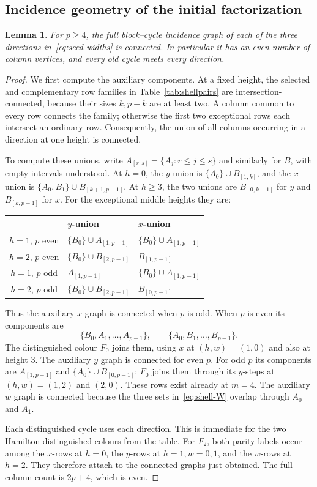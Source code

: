 \documentclass[11pt,reqno]{amsart}
\numberwithin{equation}{section}
\newtheorem{lemma}[theorem]{Lemma}
\theoremstyle{definition}
\theoremstyle{remark}
\begin{document}
\subsection{Incidence geometry of the initial factorization}
\begin{lemma}\label{lem:seed-incidence}
For $p\ge4$, the full block--cycle incidence graph of each of the three
directions in~\eqref{eq:seed-widths} is connected. In particular it has an even
number of column vertices, and every old cycle meets every direction.
\end{lemma}
\begin{proof}
We first compute the auxiliary components. At a fixed height, the selected and
complementary row families in Table~\ref{tab:shellpairs} are intersection-connected, because
their sizes $k,p-k$ are at least two. A column common to every row connects
the family; otherwise the first two exceptional rows each intersect an
ordinary row. Consequently,
the union of all columns occurring in a direction at one height is connected.

To compute these unions, write
$A_{[r,s]}=\{A_j:r\le j\le s\}$ and similarly for $B$, with empty intervals
understood. At $h=0$, the $y$-union is
$\{A_0\}\cup B_{[1,k]}$, and the $x$-union is
$\{A_0,B_1\}\cup B_{[k+1,p-1]}$. At $h\ge3$, the two unions are
$B_{[0,k-1]}$ for $y$ and $B_{[k,p-1]}$ for $x$.
For the exceptional middle heights they are:
\begin{center}
\begin{tabular}{cll}
\toprule
& $y$-union & $x$-union\\
\midrule
$h=1$, $p$ even & $\{B_0\}\cup A_{[1,p-1]}$ & $\{B_0\}\cup A_{[1,p-1]}$\\
$h=2$, $p$ even & $\{B_0\}\cup B_{[2,p-1]}$ & $B_{[1,p-1]}$\\
$h=1$, $p$ odd & $A_{[1,p-1]}$ & $\{B_0\}\cup A_{[1,p-1]}$\\
$h=2$, $p$ odd & $\{B_0\}\cup B_{[2,p-1]}$ & $B_{[0,p-1]}$\\
\bottomrule
\end{tabular}
\end{center}
Thus the auxiliary $x$ graph is connected when $p$ is odd. When $p$ is even its
components are
\[
 \{B_0,A_1,\ldots,A_{p-1}\},\qquad
 \{A_0,B_1,\ldots,B_{p-1}\}.
\]
The distinguished colour $F_0$ joins them, using $x$ at $(h,w)=(1,0)$ and also at
height $3$. The auxiliary $y$ graph is connected for even $p$. For odd $p$ its
components are $A_{[1,p-1]}$ and $\{A_0\}\cup B_{[0,p-1]}$; $F_0$ joins them
through its $y$-steps at $(h,w)=(1,2)$ and $(2,0)$. These rows exist already at
$m=4$. The auxiliary $w$ graph is connected because the three sets
in~\eqref{eq:shell-W} overlap through $A_0$ and $A_1$.

Each distinguished cycle uses each direction. This is immediate for the two Hamilton
distinguished colours from the table. For $F_2$, both parity labels occur among the
$x$-rows at $h=0$, the $y$-rows at $h=1,w=0,1$, and the $w$-rows at $h=2$.
They therefore attach to the connected graphs just obtained. The full column
count is $2p+4$, which is even.
\end{proof}
\end{document}
